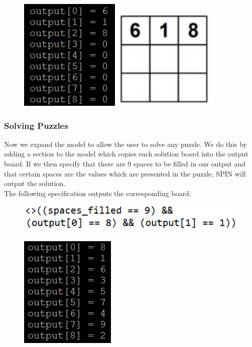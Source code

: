 \documentclass[a4paper]{article}
\begin{document}
\begin{figure} [h]
\centering
\includegraphics{commands_3}
\includegraphics{board_1}
\end{figure}

\newpage

\subsubsection{Solving Puzzles}
Now we expand the model to allow the user to solve any puzzle. We do this by adding a section to the model which copies each solution board into the output board. If we then specify that there are 9 spaces to be filled in our output and that certain spaces are the values which are presented in the puzzle, SPIN will output the solution. \\

The following specification outputs the corresponding board:

\begin{figure} [h]
\centering
\includegraphics{solved_spec}
\end{figure}

\begin{figure} [h]
\centering
\includegraphics{solution_2}
\end{figure}
\end{document}
